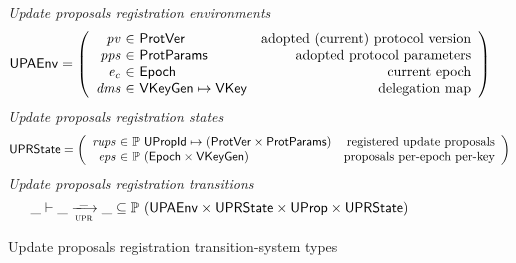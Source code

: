 \begin{figure}[htb]
  \emph{Update proposals registration  environments}
    \begin{equation*}
    \UPAEnv =
    \left(
      \begin{array}{r@{~\in~}lr}
        \var{pv} & \ProtVer & \text{adopted (current) protocol version}\\
        \var{pps} & \ProtParams & \text{adopted protocol parameters}\\
        \var{e_c} & \Epoch & \text{current epoch}\\
        \var{dms} & \VKeyGen \mapsto \VKey & \text{delegation map}\\
      \end{array}
    \right)
  \end{equation*}
  \emph{Update proposals registration states}
  \begin{equation*}
    \UPRState
    = \left(
      \begin{array}{r@{~\in~}lr}
        \var{rups} & \powerset{\UPropId \mapsto (\ProtVer \times \ProtParams)}
        & \text{registered update proposals}\\
        \var{eps} & \powerset{(\Epoch \times \VKeyGen)} & \text{proposals per-epoch per-key}\\
      \end{array}
    \right)
  \end{equation*}
  \emph{Update proposals registration transitions}
  \begin{equation*}
    \var{\_} \vdash
    \var{\_} \trans{upr}{\_} \var{\_}
    \subseteq \powerset (\UPAEnv \times \UPRState \times \UProp \times \UPRState)
  \end{equation*}
  \caption{Update proposals registration transition-system types}
  \label{fig:ts-types:up-registration}
\end{figure}

